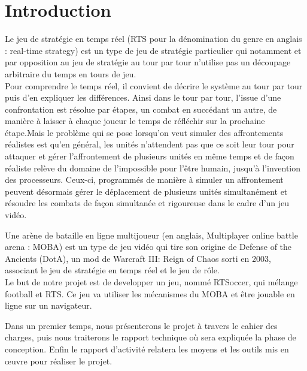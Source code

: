 \chapter{Introduction}

Le jeu de stratégie en temps réel (RTS pour la dénomination du genre en anglais : real-time strategy) est un type de jeu de stratégie particulier qui notamment et par opposition au jeu de stratégie au tour par tour n’utilise pas un découpage arbitraire du temps en tours de jeu.\\
Pour comprendre le temps réel, il convient de décrire le système au tour par tour puis d’en expliquer les différences. Ainsi dans le tour par tour, l’issue d’une confrontation est résolue par étapes, un combat en succédant un autre, de manière à laisser à chaque joueur le temps de réfléchir sur la prochaine étape.Mais le problème qui se pose lorsqu’on veut simuler des affrontements réalistes est qu’en général, les unités n’attendent pas que ce soit leur tour pour attaquer et gérer l’affrontement de plusieurs unités en même temps et de façon réaliste relève du domaine de l’impossible pour l’être humain, jusqu’à l’invention des processeurs. Ceux-ci, programmés de manière à simuler un affrontement peuvent désormais gérer le déplacement de plusieurs unités simultanément et résoudre les combats de façon simultanée et rigoureuse dans le cadre d’un jeu vidéo.

Une arène de bataille en ligne multijoueur (en anglais, Multiplayer online battle arena : MOBA) est un type de jeu vidéo qui tire son origine de Defense of the Ancients (DotA), un mod de Warcraft III: Reign of Chaos sorti en 2003, associant le jeu de stratégie en temps réel et le jeu de rôle.\\

Le but de notre projet est de developper un jeu, nommé RTSoccer, qui mélange football et RTS. Ce jeu va utiliser les mécanismes du MOBA et être jouable en ligne sur un navigateur. 

Dans un premier temps, nous présenterons le projet à travers le cahier des charges, puis nous traiterons le rapport technique où sera expliquée la phase de conception. Enfin le rapport d’activité relatera les moyens et les outils mis en œuvre pour réaliser le projet.

